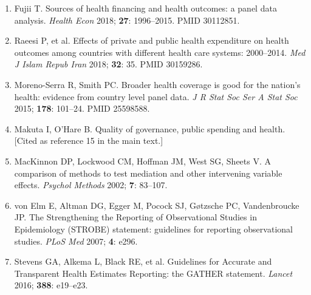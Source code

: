\documentclass[10pt,a4paper]{article}
\begin{document}
\begin{enumerate}[leftmargin=*, label=S\arabic*.]
\item[S11.] Fujii T. Sources of health financing and health outcomes: a panel data analysis. \textit{Health Econ} 2018; \textbf{27}: 1996--2015. PMID 30112851.
\item[S12.] Raeesi P, et al. Effects of private and public health expenditure on health outcomes among countries with different health care systems: 2000--2014. \textit{Med J Islam Repub Iran} 2018; \textbf{32}: 35. PMID 30159286.
\item[S13.] Moreno-Serra R, Smith PC. Broader health coverage is good for the nation's health: evidence from country level panel data. \textit{J R Stat Soc Ser A Stat Soc} 2015; \textbf{178}: 101--24. PMID 25598588.
\item[S14.] Makuta I, O'Hare B. Quality of governance, public spending and health. [Cited as reference 15 in the main text.]
\item[S15.] MacKinnon DP, Lockwood CM, Hoffman JM, West SG, Sheets V. A comparison of methods to test mediation and other intervening variable effects. \textit{Psychol Methods} 2002; \textbf{7}: 83--107.
\item[S16.] von Elm E, Altman DG, Egger M, Pocock SJ, Gøtzsche PC, Vandenbroucke JP. The Strengthening the Reporting of Observational Studies in Epidemiology (STROBE) statement: guidelines for reporting observational studies. \textit{PLoS Med} 2007; \textbf{4}: e296.
\item[S17.] Stevens GA, Alkema L, Black RE, et al. Guidelines for Accurate and Transparent Health Estimates Reporting: the GATHER statement. \textit{Lancet} 2016; \textbf{388}: e19--e23.
\end{enumerate}
\end{document}
